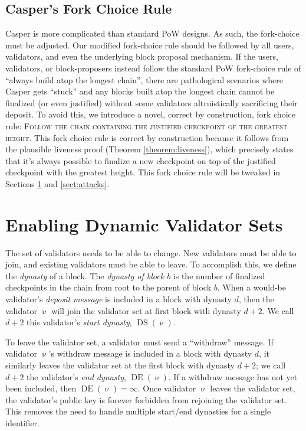 \documentclass[12pt]{article}
\newcommand{\DS}{\operatorname{DS}}
\newcommand{\DE}{\operatorname{DE}}
\begin{document}
\subsection{Casper's Fork Choice Rule}
\label{sect:forkchoice}

Casper is more complicated than standard PoW designs.  As such, the fork-choice must be adjusted.  Our modified fork-choice rule should be followed by all users, validators, and even the underlying block proposal mechanism.  If the users, validators, or block-proposers instead follow the standard PoW fork-choice rule of ``always build atop the longest chain'', there are pathological scenarios where Casper gets ``stuck'' and any blocks built atop the longest chain cannot be finalized (or even justified) without some validators altruistically sacrificing their deposit.  To avoid this, we introduce a novel, correct by construction, fork choice rule: \textsc{Follow the chain containing the justified checkpoint of the greatest height}.  This fork choice rule is correct by construction because it follows from the plausible liveness proof (Theorem \ref{theorem:liveness}), which precisely states that it's always possible to finalize a new checkpoint on top of the justified checkpoint with the greatest height.  This fork choice rule will be tweaked in Sections \ref{sect:join_and_leave} and \ref{sect:attacks}.

\section{Enabling Dynamic Validator Sets}
\label{sect:join_and_leave}

The set of validators needs to be able to change.  New validators must be able to join, and existing validators must be able to leave.  To accomplish this, we define the \textit{dynasty} of a block.  The \emph{dynasty of block $b$} is the number of finalized checkpoints in the chain from root to the parent of block $b$.  When a would-be validator's \emph{deposit message} is included in a block with dynasty $d$, then the validator $\upnu$ will join the validator set at first block with dynasty $d+2$.  We call $d+2$ this validator's \textit{start dynasty}, $\DS(\upnu)$.


To leave the validator set, a validator must send a ``withdraw'' message. If validator $\upnu$'s  withdraw message is included in a block with dynasty $d$, it similarly leaves the validator set at the first block with dynasty $d+2$; we call $d+2$ the validator's \textit{end dynasty}, $\DE(\upnu)$.  If a withdraw message has not yet been included, then $\DE(\upnu) = \infty$.  Once validator $\upnu$ leaves the validator set, the validator's public key is forever forbidden from rejoining the validator set.  This removes the need to handle multiple start/end dynasties for a single identifier.
\end{document}
